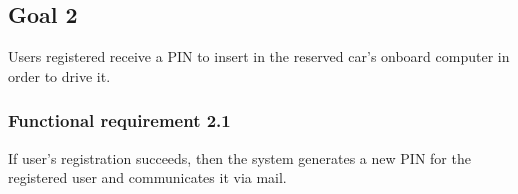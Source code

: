 \subsection{Goal 2}
Users registered receive a PIN to insert in the reserved car's onboard computer in order to drive it.

\setcounter{secnumdepth}{3}
\subsubsection{Functional requirement 2.1}
If user's registration succeeds, then the system generates a new PIN for the registered user and communicates it via mail.